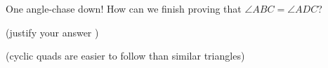 

One angle-chase down!  How can we finish proving that $\angle ABC=\angle ADC$?

(justify your answer  )

(cyclic quads are easier to follow than similar triangles)










